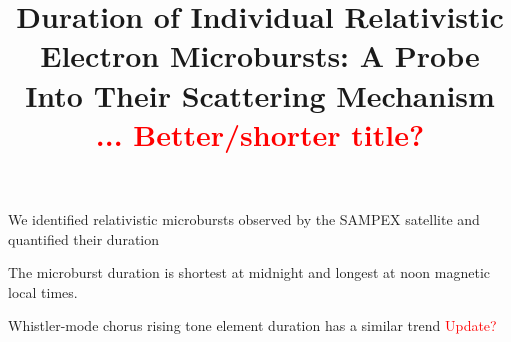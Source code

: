\documentclass[draft]{agujournal2019}
\begin{document}
%
%



\title{Duration of Individual Relativistic Electron Microbursts: A Probe Into Their Scattering Mechanism \textcolor{red}{... Better/shorter title?}}

%
%









\begin{keypoints}
\item We identified relativistic microbursts observed by the SAMPEX satellite and quantified their duration
\item The microburst duration is shortest at midnight and longest at noon magnetic local times.
\item Whistler-mode chorus rising tone element duration has a similar trend \textcolor{red}{Update?}
\end{keypoints}
\end{document}
